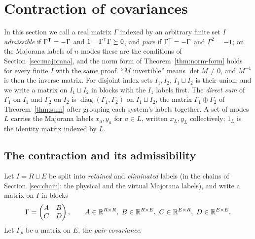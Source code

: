 \section{Contraction of covariances}
\label{sec:contraction}

In this section we call a real matrix $\Gamma$ indexed by an
arbitrary finite set $I$ \emph{admissible} if $\Gamma^{\mathsf T}=-\Gamma$ and
$1-\Gamma^{\mathsf T}\Gamma\succeq0$, and \emph{pure} if $\Gamma^{\mathsf T}=-\Gamma$ and
$\Gamma^2=-1$; on the Majorana labels of $n$ modes these are the conditions of
Section~\ref{sec:majorana}, and the norm form of Theorem~\ref{thm:norm-form} holds for
every finite $I$ with the same proof. ``$M$ invertible'' means $\det M\neq0$, and
$M^{-1}$ is then the inverse matrix. For disjoint index sets $I_1,I_2$, $I_1\sqcup I_2$
is their union, and we write a matrix on $I_1\sqcup I_2$ in blocks with the $I_1$
labels first. The \emph{direct sum} of $\Gamma_1$ on $I_1$ and $\Gamma_2$ on $I_2$
is $\operatorname{diag}(\Gamma_1,\Gamma_2)$ on $I_1\sqcup I_2$, the matrix
$\Gamma_1\oplus\Gamma_2$ of Theorem~\ref{thm:sum} after grouping each system's labels
together. A set of modes $L$ carries the Majorana labels $x_a,y_a$ for $a\in L$,
written $x_L,y_L$ collectively; $1_L$ is the identity matrix indexed by $L$.

\subsection{The contraction and its admissibility}
Let $I=R\sqcup E$ be split into \emph{retained} and \emph{eliminated} labels (in the chains of
Section~\ref{sec:chain}: the physical and the virtual Majorana labels), and write
a matrix on $I$ in blocks
\[
 \Gamma=\begin{pmatrix}A&B\\C&D\end{pmatrix},\qquad
 A\in\R^{R\times R},\ B\in\R^{R\times E},\ C\in\R^{E\times R},\ D\in\R^{E\times E}.
\]
Let $\Gamma_p$ be a matrix on $E$, the \emph{pair covariance}.

